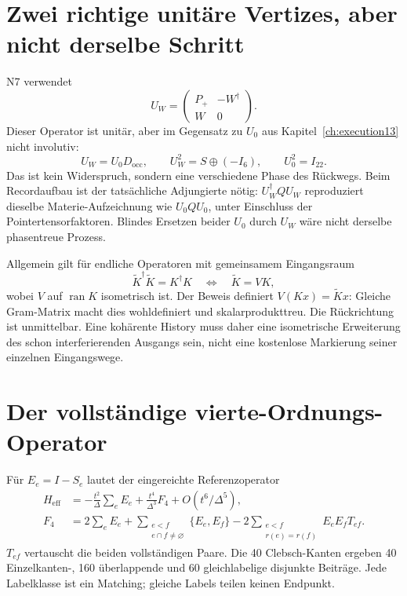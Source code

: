 \section{Zwei richtige unitäre Vertizes, aber nicht derselbe Schritt}
N7 verwendet
\begin{equation}
U_W=\begin{pmatrix}P_+&-W^\dagger\\W&0\end{pmatrix}.
\end{equation}
Dieser Operator ist unitär, aber im Gegensatz zu $U_0$ aus Kapitel~\ref{ch:execution13} nicht involutiv:
\begin{equation}
U_W=U_0D_{\mathrm{occ}},\qquad
U_W^2=S\oplus(-I_6),\qquad U_0^2=I_{22}.
\end{equation}
Das ist kein Widerspruch, sondern eine verschiedene Phase des Rückwegs. Beim Recordaufbau ist der tatsächliche Adjungierte nötig:
$U_W^\dagger Q U_W$ reproduziert dieselbe Materie-Aufzeichnung wie $U_0QU_0$, unter Einschluss der Pointertensorfaktoren. Blindes Ersetzen beider $U_0$ durch $U_W$ wäre nicht derselbe phasentreue Prozess.

Allgemein gilt für endliche Operatoren mit gemeinsamem Eingangsraum
\begin{equation}
\widetilde K^\dagger\widetilde K=K^\dagger K
\quad\Longleftrightarrow\quad
\widetilde K=VK,
\end{equation}
wobei $V$ auf $\operatorname{ran}K$ isometrisch ist. Der Beweis definiert $V(Kx)=\widetilde Kx$: Gleiche Gram-Matrix macht dies wohldefiniert und skalarprodukttreu. Die Rückrichtung ist unmittelbar. Eine kohärente History muss daher eine isometrische Erweiterung des schon interferierenden Ausgangs sein, nicht eine kostenlose Markierung seiner einzelnen Eingangswege.

\section{Der vollständige vierte-Ordnungs-Operator}
Für $E_e=I-S_e$ lautet der eingereichte Referenzoperator
\begin{align}
H_{\mathrm{eff}}&=-\frac{t^2}{\Delta}\sum_eE_e
+\frac{t^4}{\Delta^3}F_4+O(t^6/\Delta^5),\\
F_4&=2\sum_eE_e+
\sum_{\substack{e<f\\e\cap f\ne\varnothing}}\{E_e,E_f\}
-2\sum_{\substack{e<f\\r(e)=r(f)}}E_eE_fT_{ef}.
\end{align}
$T_{ef}$ vertauscht die beiden vollständigen Paare. Die 40 Clebsch-Kanten ergeben 40 Einzelkanten-, 160 überlappende und 60 gleichlabelige disjunkte Beiträge. Jede Labelklasse ist ein Matching; gleiche Labels teilen keinen Endpunkt.


